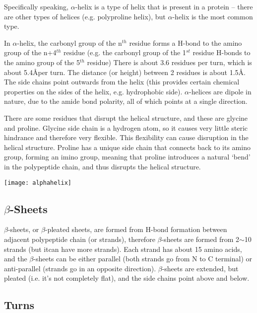 \documentclass[a4paper, 12pt]{report}
\begin{document}
Specifically speaking, $\alpha$-helix is a type of helix that is present in a protein -- there are other types of helices (e.g. polyproline helix), but $\alpha$-helix is the most common type.

In $\alpha$-helix, the carbonyl group of the n$^{th}$ residue forms a H-bond to the amino group of the n+4$^{th}$ residue (e.g. the carbonyl group of the 1$^{st}$ residue H-bonds to the amino group of the 5$^{th}$ residue)
There is about 3.6 residues per turn, which is about 5.4\AA per turn.
The distance (or height) between 2 residues is about 1.5\AA.
The side chains point outwards from the helix (this provides certain chemical properties on the sides of the helix, e.g. hydrophobic side). 
$\alpha$-helices are dipole in nature, due to the amide bond polarity, all of which points at a single direction.

There are some residues that disrupt the helical structure, and these are glycine and proline.
Glycine side chain is a hydrogen atom, so it causes very little steric hindrance and therefore very flexible.
This flexibility can cause disruption in the helical structure.
Proline has a unique side chain that connects back to its amino group, forming an imino group, meaning that proline introduces a natural `bend' in the polypeptide chain, and thus disrupts the helical structure.

\begin{center}
\texttt{[image: alphahelix]}
\end{center}

\subsection{$\beta$-Sheets}

$\beta$-sheets, or $\beta$-pleated sheets, are formed from H-bond formation between adjacent polypeptide chain (or strands), therefore $\beta$-sheets are formed from 2$\sim$10 strands (but itcan have more strands).
Each strand has about 15 amino acids, and the $\beta$-sheets can be either parallel (both strands go from N to C terminal) or anti-parallel (strands go in an opposite direction).
$\beta$-sheets are extended, but pleated (i.e. it's not completely flat), and the side chains point above and below.

\subsection{Turns}
\end{document}
